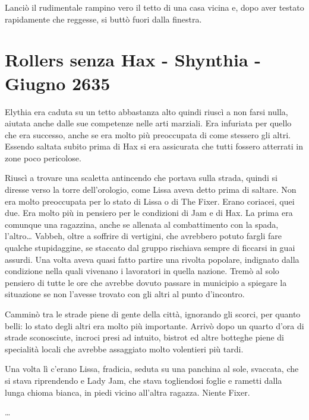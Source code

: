     Lanciò il rudimentale rampino vero il tetto di una casa vicina e, dopo
    aver testato rapidamente che reggesse, si buttò fuori dalla finestra.
   
    \section{Rollers senza Hax - Shynthia - Giugno 2635}
    Elythia era caduta su un tetto abbastanza alto quindi riuscì a non
    farsi nulla, aiutata anche dalle sue competenze nelle arti marziali.
    Era infuriata per quello che era successo, anche se era molto più
    preoccupata di come stessero gli altri. Essendo saltata subito prima di
    Hax si era assicurata che tutti fossero atterrati in zone poco
    pericolose.

    Riuscì a trovare una scaletta antincendo che portava sulla strada,
    quindi si diresse verso la torre dell'orologio, come Lissa aveva detto
    prima di saltare. Non era molto preoccupata per lo stato di Lissa o di
    The Fixer. Erano coriacei, quei due. Era molto più in pensiero per le
    condizioni di Jam e di Hax. La prima era comunque una ragazzina, anche
    se allenata al combattimento con la spada, l'altro\dots{} Vabbeh, oltre
    a soffrire di vertigini, che avrebbero potuto fargli fare qualche
    stupidaggine, se staccato dal gruppo rischiava sempre di ficcarsi in
    guai assurdi. Una volta aveva quasi fatto partire una rivolta popolare,
    indignato dalla condizione nella quali vivenano i lavoratori in quella
    nazione.
    Tremò al solo pensiero di tutte le ore che avrebbe dovuto passare in
    municipio a spiegare la situazione se non l'avesse trovato con gli
    altri al punto d'incontro.

    Camminò tra le strade piene di gente della città, ignorando gli scorci,
    per quanto belli: lo stato degli altri era molto più importante. Arrivò
    dopo un quarto d'ora di strade sconosciute, incroci presi ad intuito,
    bistrot ed altre botteghe piene di specialità locali che avrebbe
    assaggiato molto volentieri più tardi.

    Una volta lì c'erano Lissa, fradicia, seduta su una panchina al sole,
    svaccata, che si stava riprendendo e Lady Jam, che stava togliendosi
    foglie e rametti dalla lunga chioma bianca, in piedi vicino all'altra
    ragazza. Niente Fixer.

    \dots{}

